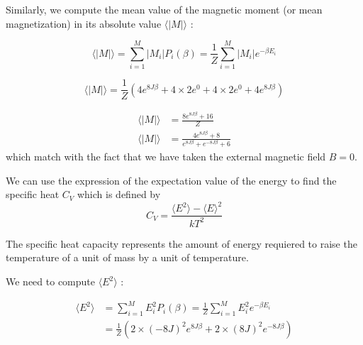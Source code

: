 \documentclass[a4paper, twoside, 11pt]{report}
\theoremstyle{theorem}
\theoremstyle{remark}
\theoremstyle{exemple}
\begin{document}
            Similarly, we compute the mean value of the magnetic moment (or mean magnetization) in its absolute value $\langle |M| \rangle$ :
            
                \begin{equation*}
                    \langle |M| \rangle = \sum\limits_{i=1}^{M}|M_i|P_i(\beta) = \frac{1}{Z}\sum\limits_{i=1}^{M}|M_i| e^{-\beta E_i}
                \end{equation*}
                
                \begin{equation*}
                    \langle |M| \rangle = \frac{1}{Z} \left(4 e^{8J\beta} + 4 \times 2 e^{0} + 4 \times 2 e^{0} + 4 e^{8J\beta}\right) 
                \end{equation*}
                
                \begin{align*}
                    \langle |M| \rangle &= \frac{8e^{8J\beta}+16}{Z} \tag{6} \\
                    \langle |M| \rangle &= \frac{4e^{8J\beta}+8}{e^{8J\beta}+e^{-8J\beta}+6}
                \end{align*}
            which match with the fact that we have taken the external magnetic field $B=0$.
            
            We can use the expression of the expectation value of the energy to find the specific heat $C_V$ which is defined by
                \begin{equation*}
                    C_V = \frac{\langle E^2 \rangle - \langle E \rangle ^2}{kT^2}
                \end{equation*}
                
            The specific heat capacity represents the amount of energy requiered to raise the temperature of a unit of mass by a unit of temperature. 
                
            We need to compute $\langle E^2 \rangle$ :
                
                \begin{align*}
                    \langle E^2 \rangle &= \sum\limits_{i=1}^{M}E_i^2P_i(\beta) =\frac{1}{Z}\sum\limits_{i=1}^{M}E_i^2 e^{-\beta E_i} \\
                    &= \frac{1}{Z}\left(2 \times (-8J)^2 e^{8J\beta} + 2 \times (8J)^2 e^{-8J\beta} \right)
                \end{align*}
                
\end{document}
